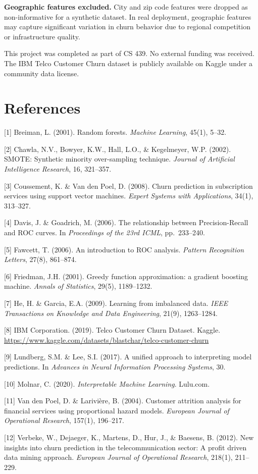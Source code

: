 \documentclass{article}
\begin{document}
\textbf{Geographic features excluded.} City and zip code features were dropped as
non-informative for a synthetic dataset. In real deployment, geographic features
may capture significant variation in churn behavior due to regional competition
or infrastructure quality.


\begin{ack}
This project was completed as part of CS 439. No external funding was received.
The IBM Telco Customer Churn dataset is publicly available on Kaggle under a
community data license.
\end{ack}


\section*{References}

{
\small

[1] Breiman, L. (2001). Random forests. \textit{Machine Learning}, 45(1), 5--32.

[2] Chawla, N.V., Bowyer, K.W., Hall, L.O., \& Kegelmeyer, W.P. (2002). SMOTE:
Synthetic minority over-sampling technique. \textit{Journal of Artificial Intelligence
Research}, 16, 321--357.

[3] Coussement, K. \& Van den Poel, D. (2008). Churn prediction in subscription
services using support vector machines. \textit{Expert Systems with Applications},
34(1), 313--327.

[4] Davis, J. \& Goadrich, M. (2006). The relationship between Precision-Recall and
ROC curves. In \textit{Proceedings of the 23rd ICML}, pp.\ 233--240.

[5] Fawcett, T. (2006). An introduction to ROC analysis. \textit{Pattern Recognition
Letters}, 27(8), 861--874.

[6] Friedman, J.H. (2001). Greedy function approximation: a gradient boosting machine.
\textit{Annals of Statistics}, 29(5), 1189--1232.

[7] He, H. \& Garcia, E.A. (2009). Learning from imbalanced data. \textit{IEEE
Transactions on Knowledge and Data Engineering}, 21(9), 1263--1284.

[8] IBM Corporation. (2019). Telco Customer Churn Dataset. Kaggle.
\url{https://www.kaggle.com/datasets/blastchar/telco-customer-churn}

[9] Lundberg, S.M. \& Lee, S.I. (2017). A unified approach to interpreting model
predictions. In \textit{Advances in Neural Information Processing Systems}, 30.

[10] Molnar, C. (2020). \textit{Interpretable Machine Learning}. Lulu.com.

[11] Van den Poel, D. \& Larivi\`{e}re, B. (2004). Customer attrition analysis for
financial services using proportional hazard models. \textit{European Journal of
Operational Research}, 157(1), 196--217.

[12] Verbeke, W., Dejaeger, K., Martens, D., Hur, J., \& Baesens, B. (2012). New
insights into churn prediction in the telecommunication sector: A profit driven data
mining approach. \textit{European Journal of Operational Research}, 218(1), 211--229.

}
\end{document}
